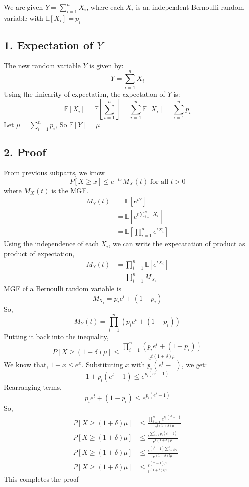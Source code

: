 \begin{solution}
	We are given $Y = \sum^n_{i=1}X_i$, where each $X_i$ is an independent Bernoulli random variable with $\mathds{E}[X_i] = p_i$ 
	\subsection*{1. Expectation of $Y$}
	The new random variable $Y$ is given by:
	\[Y = \sum^n_{i=1}X_i\]
	Using the liniearity of expectation, the expectation of $Y$ is:
	\[\mathds{E}[X_i] = \mathds{E}\left[\sum_{i=1}^{n}\right] = \sum_{i=1}^{n}\mathds{E}[X_i] = \sum_{i=1}^{n}p_i\]
	Let $\mu = \sum_{i=1}^{n}p_i$, So $\mathds{E}[Y]=\mu$
	\subsection*{2. Proof}
	From previous subparts, we know
	\[P[X\geq x]\leq e^{-tx}M_X(t) \text{ for all } t>0\]
	where $M_X(t)$ is the MGF.
	\begin{align}
		M_Y(t) & = \mathds{E}[e^{tY}]\\
		& = \mathds{E}[e^{t\sum_{i=1}^{n}X_i}]\\
		& = \mathds{E}\left[\prod_{i=1}^{n}e^{tX_i}\right]
	\end{align}
	Using the independence of each $X_i$, we can write the expecatation of product as product of expectation,
	\begin{align}
		M_Y(t) & = \prod_{i=1}^{n}\mathds{E}[e^{tX_i}]\\
		& = \prod_{i=1}^{n}M_{X_i}
	\end{align}
	MGF of a Bernoulli random variable is 
	\[M_{X_i} = p_ie^t+(1-p_i)\]
	So,
	\[
		M_Y(t) = \prod_{i=1}^{n}(p_ie^t+(1-p_i))
	\]
	Putting it back into the inequality,
	\[P[X\geq (1+\delta)\mu]\leq \frac{\prod_{i=1}^{n}(p_ie^t+(1-p_i))}{e^{t(1+\delta)\mu}}\]
	We know that, $1+x \leq e^x$. Substituting $x$ with $p_i(e^t-1)$, we get:
	\[1+p_i(e^t-1) \leq e^{p_i(e^t-1)}\]
	Rearranging terms,
	\[p_ie^t + (1-p_i) \leq e^{p_i(e^t-1)} \]
	So,
	\begin{align}
		P[X\geq (1+\delta)\mu] & \leq \frac{\prod_{i=1}^{n}e^{p_i(e^t-1)}}{e^{t(1+\delta)\mu}} \\
		P[X\geq (1+\delta)\mu] & \leq \frac{e^{\sum_{i=1}^{n}p_i(e^t-1)}}{e^{t(1+\delta)\mu}}\\
		P[X\geq (1+\delta)\mu] & \leq \frac{e^{(e^t-1)\sum_{i=1}^{n}p_i}}{e^{(1+\delta)t\mu}}\\
		P[X\geq (1+\delta)\mu] & \leq \frac{e^{(e^t-1)\mu}}{e^{(1+\delta)t\mu}}
		\label{en:q4dineq}
	\end{align}
	This completes the proof

\end{solution}
